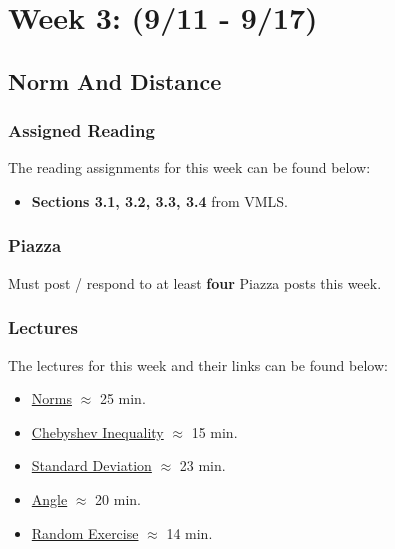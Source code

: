 \clearpage
\chapter{Week 3: (9/11 - 9/17)}

\section{Norm And Distance}

\subsection{Assigned Reading}

The reading assignments for this week can be found below:

\begin{itemize}
    \item \textbf{Sections 3.1, 3.2, 3.3, 3.4} from VMLS.
\end{itemize}

\subsection{Piazza}

Must post / respond to at least \textbf{four} Piazza posts this week.  

\subsection{Lectures}

The lectures for this week and their links can be found below:

\begin{itemize}
    \item \href{https://applied.cs.colorado.edu/mod/hvp/view.php?id=50692}{Norms} $\approx$ 25 min.
    \item \href{https://applied.cs.colorado.edu/mod/hvp/view.php?id=50693}{Chebyshev Inequality} $\approx$ 15 min.
    \item \href{https://applied.cs.colorado.edu/mod/hvp/view.php?id=50694}{Standard Deviation} $\approx$ 23 min.
    \item \href{https://applied.cs.colorado.edu/mod/hvp/view.php?id=50695}{Angle} $\approx$ 20 min.
    \item \href{https://applied.cs.colorado.edu/mod/hvp/view.php?id=50696}{Random Exercise} $\approx$ 14 min.
\end{itemize}

